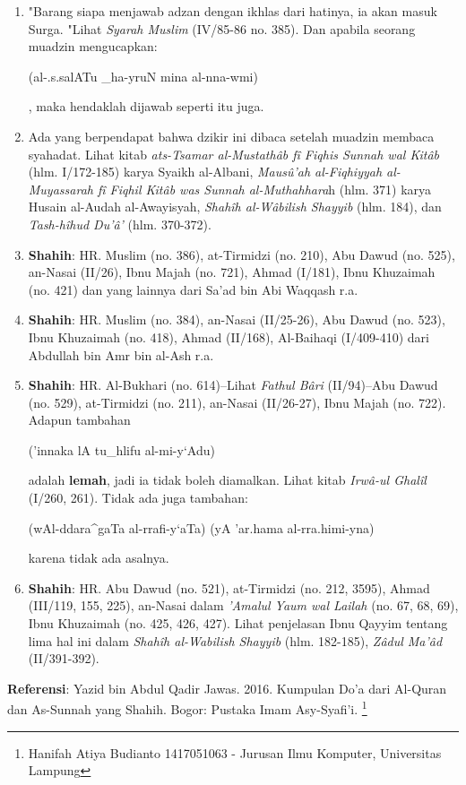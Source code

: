 \documentclass[a4paper,12pt]{article}
\begin{document}
\begin{enumerate}
\item "Barang siapa menjawab adzan dengan ikhlas dari hatinya, ia akan 
masuk Surga. "Lihat \textit{Syarah Muslim} (IV/85-86 no. 385). Dan apabila 
seorang muadzin mengucapkan: \begin{arabtext} (al-.s.salATu _ha-yruN mina 
al-nna-wmi) \end{arabtext}, maka hendaklah dijawab seperti itu juga.
\item Ada yang berpendapat bahwa dzikir ini dibaca setelah muadzin membaca 
syahadat. Lihat kitab \textit{ats-Tsamar al-Mustath\^{a}b f\^{i} Fiqhis 
Sunnah wal Kit\^{a}b} (hlm. I/172-185) karya Syaikh al-Albani, 
\textit{Maus\^{u}'ah al-Fiqhiyyah al-Muyassarah f\^{i} Fiqhil Kit\^{a}b was
Sunnah al-Muthahhara}h (hlm. 371) karya Husain al-Audah al-Awayisyah, 
\textit{Shah\^{i}h al-W\^{a}bilish Shayyib} (hlm. 184), dan 
\textit{Tash-h\^{i}hud Du'\^{a}'} (hlm. 370-372).
\item \textbf{Shahih}: HR. Muslim (no. 386), at-Tirmidzi (no. 210), Abu 
Dawud (no. 525), an-Nasai (II/26), Ibnu Majah (no. 721), Ahmad (I/181), 
Ibnu Khuzaimah (no. 421) dan yang lainnya dari Sa'ad bin Abi Waqqash r.a.
\item \textbf{Shahih}: HR. Muslim (no. 384), an-Nasai (II/25-26), Abu Dawud
(no. 523), Ibnu Khuzaimah (no. 418), Ahmad (II/168), Al-Baihaqi (I/409-410)
dari Abdullah bin Amr bin al-Ash r.a.
\item \textbf{Shahih}: HR. Al-Bukhari (no. 614)--Lihat 
\textit{Fathul B\^{a}ri} (II/94)--Abu Dawud (no. 529), at-Tirmidzi (no. 
211), an-Nasai (II/26-27), Ibnu Majah (no. 722). Adapun tambahan 
\begin{arabtext} ('innaka lA tu_hlifu al-mi-y`Adu) \end{arabtext} adalah 
\textbf{lemah}, jadi ia tidak boleh diamalkan. Lihat kitab 
\textit{Irw\^{a}-ul Ghal\^{i}l} (I/260, 261). Tidak ada juga tambahan: 
\begin{arabtext} (wAl-ddara^gaTa al-rrafi-y`aTa) (yA 'ar.hama 
al-rra.himi-yna) \end{arabtext} karena tidak ada asalnya.
\item \textbf{Shahih}: HR. Abu Dawud (no. 521), at-Tirmidzi (no. 212, 
3595), Ahmad (III/119, 155, 225), an-Nasai dalam \textit{'Amalul Yaum wal 
Lailah} (no. 67, 68, 69), Ibnu Khuzaimah (no. 425, 426, 427). Lihat penjelasan 
Ibnu Qayyim tentang lima hal ini dalam \textit{Shah\^{i}h al-Wabilish 
Shayyib} (hlm. 182-185), \textit{Z\^{a}dul Ma'\^{a}d} (II/391-392).
\end{enumerate}
\textbf{Referensi}: Yazid bin Abdul Qadir Jawas. 2016. Kumpulan Do'a dari
Al-Quran dan As-Sunnah yang Shahih. Bogor: Pustaka Imam Asy-Syafi'i.
\footnote{Hanifah Atiya Budianto 1417051063 - Jurusan Ilmu Komputer,
Universitas Lampung}
\end{document}
